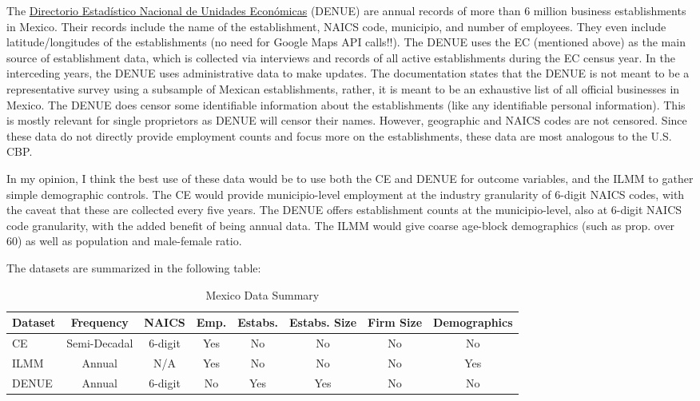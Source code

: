 The \href{https://en.www.inegi.org.mx/app/descarga/}{Directorio Estadístico Nacional de Unidades Económicas} (DENUE) are annual records of more than 6 million business establishments in Mexico. 
Their records include the name of the establishment, NAICS code, municipio, and number of employees.
They even include latitude/longitudes of the establishments (no need for Google Maps API calls!!).
The DENUE uses the EC (mentioned above) as the main source of establishment data, which is collected via interviews and records of all active establishments during the EC census year.
In the interceding years, the DENUE uses administrative data to make updates.
The documentation states that the DENUE is not meant to be a representative survey using a subsample of Mexican establishments, rather, it is meant to be an exhaustive list of all official businesses in Mexico.
The DENUE does censor some identifiable information about the establishments (like any identifiable personal information).
This is mostly relevant for single proprietors as DENUE will censor their names.
However, geographic and NAICS codes are not censored.
Since these data do not directly provide employment counts and focus more on the establishments, these data are most analogous to the U.S. CBP.

In my opinion, I think the best use of these data would be to use both the CE and DENUE for outcome variables, and the ILMM to gather simple demographic controls.
The CE would provide municipio-level employment at the industry granularity of 6-digit NAICS codes, with the caveat that these are collected every five years.
The DENUE offers establishment counts at the municipio-level, also at 6-digit NAICS code granularity, with the added benefit of being annual data.
The ILMM would give coarse age-block demographics (such as prop. over 60) as well as population and male-female ratio.

The datasets are summarized in the following table:

\begin{table}[H]
    \centering
    \caption{Mexico Data Summary}
    
    \begin{tabular}{l|c|c|c|c|c|c|c}
    \toprule
     Dataset & Frequency & NAICS & Emp. & Estabs. & Estabs. Size & Firm Size & Demographics \\
     \midrule
     CE    & Semi-Decadal & 6-digit & Yes & No & No & No & No \\
     ILMM   & Annual & N/A & Yes & No & No & No & Yes \\ 
     DENUE    & Annual & 6-digit & No & Yes & Yes & No & No \\
    \bottomrule
    \end{tabular}
\end{table}

